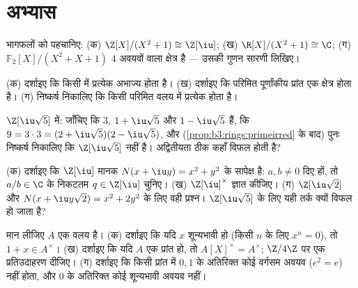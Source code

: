 \section{अभ्यास}

\begin{exercise}[$\star$]\label{exo:b3:rings:1}
भागफलों को पहचानिए: (क) $\Z[X]/(X^2 + 1) \cong \Z[\iu]$; (ख) $\R[X]/(X^2+1) \cong \C$; (ग) $\mathbb F_2[X]/(X^2 + X + 1)$ $4$
अवयवों वाला क्षेत्र है --- उसकी गुणन सारणी लिखिए।
\end{exercise}

\begin{exercise}[$\star$]\label{exo:b3:rings:2}
(क) दर्शाइए कि किसी  में प्रत्येक  अभाज्य होता है।
(ख) दर्शाइए कि परिमित पूर्णांकीय प्रांत एक क्षेत्र होता है।
(ग) निष्कर्ष निकालिए कि किसी परिमित वलय में प्रत्येक 
 होता है।
\end{exercise}

\begin{exercise}[$\star$]\label{exo:b3:rings:3}
$\Z[\iu\sqrt5]$ में: जाँचिए कि $3$, $1 + \iu\sqrt5$ और $1 -
\iu\sqrt5$  हैं, कि
$9 = 3\cdot 3 = (2 +
\iu\sqrt5)(2 - \iu\sqrt5)$, और (\cref{prop:b3:rings:primeirred} के बाद) पुनः निष्कर्ष निकालिए कि $\Z[\iu\sqrt5]$ 
नहीं है। अद्वितीयता ठीक कहाँ विफल होती है?
\end{exercise}

\begin{exercise}[$\star\star$]\label{exo:b3:rings:4}
(क) दर्शाइए कि $\Z[\iu]$ मानक $N(x + \iu y) =
x^2 + y^2$ के सापेक्ष  है: $a, b \neq 0$
दिए हों, तो $a/b \in \C$ के निकटतम $q \in \Z[\iu]$ चुनिए।
(ख) $\Z[\iu]^\times$ ज्ञात कीजिए।
(ग) $\Z[\iu\sqrt2]$ और $N(x + \iu y\sqrt2) =
x^2 + 2y^2$ के लिए वही प्रश्न। $\Z[\iu\sqrt5]$ के लिए यही तर्क
क्यों विफल हो जाता है?
\end{exercise}

\begin{exercise}[$\star\star$]\label{exo:b3:rings:5}
मान लीजिए $A$ एक वलय है। (क) दर्शाइए कि यदि $x$ शून्यभावी
हो (किसी $n$ के लिए $x^n = 0$), तो $1 + x \in A^\times$। (ख) दर्शाइए कि यदि
$A$ एक प्रांत हो, तो $A[X]^\times = A^\times$; $\Z/4\Z$ पर एक प्रतिउदाहरण दीजिए।
(ग) दर्शाइए कि किसी प्रांत में $0, 1$ के अतिरिक्त कोई वर्गसम अवयव
($e^2 = e$) नहीं होता, और $0$ के अतिरिक्त कोई शून्यभावी अवयव नहीं।
\end{exercise}


